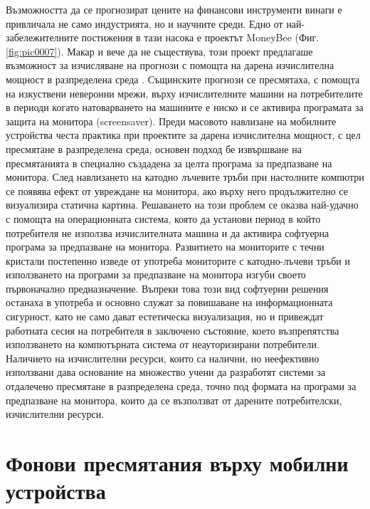 \documentclass[book,14pt,oneside,openany]{memoir}
\begin{document}
Възможността да се прогнозират цените на финансови инструменти винаги е привличала не само индустрията, но и научните среди. Едно от най-забележителните постижения в тази насока е проектът MoneyBee (Фиг. \ref{fig:pic0007}). Макар и вече да не съществува, този проект предлагаше възможност за изчисляване на прогнози с помощта на дарена изчислителна мощност в разпределена среда \cite{bohn}. Същинските прогнози се пресмятаха, с помощта на изкуствени неверонни мрежи, върху изчислителните машини на потребителите в периоди когато натоварването на машините е ниско и се активира програмата за защита на монитора (screensaver). Преди масовото навлизане на мобилните устройства честа практика при проектите за дарена изчислителна мощност, с цел пресмятане в разпределена среда, основен подход бе извършване на пресмятанията в специално създадена за целта програма за предпазване на монитора. След навлизането на катодно лъчевите тръби при настолните компютри се появява ефект от увреждане на монитора, ако върху него продължително се визуализира статична картина. Решаването на този проблем се оказва най-удачно с помощта на операционната система, която да установи период в който потребителя не използва изчислителната машина и да активира софтуерна програма за предпазване на монитора. Развитието на мониторите с течни кристали постепенно изведе от употреба мониторите с катодно-лъчеви тръби и използването на програми за предпазване на монитора изгуби своето първоначално предназначение. Въпреки това този вид софтуерни решения останаха в употреба и основно служат за повишаване на информационната сигурност, като не само дават естетическа визуализация, но и привеждат работната сесия на потребителя в заключено състояние, което възпрепятства използването на компютърната система от неауторизирани потребители. Наличието на изчислителни ресурси, които са налични, но неефективно използвани дава основание на множество учени да разработят системи за отдалечено пресмятане в разпределена среда, точно под формата на програми за предпазване на монитора, които да се възползват от дарените потребителски, изчислителни ресурси. 

\section{Фонови пресмятания върху мобилни устройства}
\end{document}
